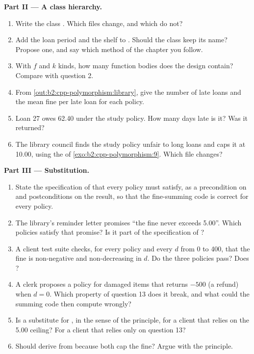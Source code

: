 \begin{problem}
\medskip\noindent\textbf{Part II --- A class hierarchy.}\par\nopagebreak
\begin{enumerate}[resume, beginpenalty=10000]
\item Write the class . Which files change, and which do not?
\item Add the loan period and the shelf to . Should the class keep its name? Propose one, and say
which method of the chapter you follow.
\item With $f$  and $k$ kinds, how many function bodies does the design contain? Compare with
question 2.
\item From \cref{out:b2:cpp-polymorphism:library}, give the number of late loans and the mean fine per late loan for
each policy.
\item Loan 27 owes 62.40 under the study policy. How many days late is it? Was it returned?
\item The library council finds the study policy unfair to long loans and caps it at 10.00, using the
 of \cref{exo:b2:cpp-polymorphism:9}. Which file changes?
\end{enumerate}

\medskip\noindent\textbf{Part III --- Substitution.}\par\nopagebreak
\begin{enumerate}[resume, beginpenalty=10000]
\item State the specification of  that every policy must satisfy, as a precondition on
 and postconditions on the result, so that the fine-summing code is correct for every policy.
\item The library's reminder letter promises ``the fine never exceeds 5.00''. Which policies satisfy that promise?
Is it part of the specification of ?
\item A client test suite checks, for every policy and every $d$ from 0 to 400, that the fine is non-negative and
non-decreasing in $d$. Do the three policies pass? Does ?
\item A clerk proposes a policy for damaged items that returns $-500$ (a refund) when $d = 0$. Which property of
question 13 does it break, and what could the summing code then compute wrongly?
\item Is  a substitute for , in the sense of the principle, for a client that
relies on the 5.00 ceiling? For a client that relies only on question 13?
\item Should  derive from  because both cap the fine? Argue with the principle.
\end{enumerate}


\end{problem}
